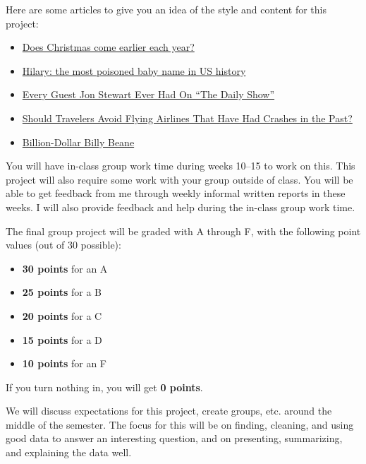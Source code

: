 \documentclass[]{book}
\providecommand{\tightlist}{%
  \setlength{\itemsep}{0pt}\setlength{\parskip}{0pt}}
\begin{document}
Here are some articles to give you an idea of the style and content for
this project:

\begin{itemize}
\tightlist
\item
  \href{http://www.statslife.org.uk/culture/1892-does-christmas-really-come-earlier-every-year}{Does
  Christmas come earlier each year?}
\item
  \href{http://hilaryparker.com/2013/01/30/hilary-the-most-poisoned-baby-name-in-us-history/}{Hilary:
  the most poisoned baby name in US history}
\item
  \href{http://fivethirtyeight.com/datalab/every-guest-jon-stewart-ever-had-on-the-daily-show/}{Every
  Guest Jon Stewart Ever Had On ``The Daily Show''}
\item
  \href{http://fivethirtyeight.com/features/should-travelers-avoid-flying-airlines-that-have-had-crashes-in-the-past/}{Should
  Travelers Avoid Flying Airlines That Have Had Crashes in the Past?}
\item
  \href{http://fivethirtyeight.com/features/billion-dollar-billy-beane/}{Billion-Dollar
  Billy Beane}
\end{itemize}

You will have in-class group work time during weeks 10--15 to work on
this. This project will also require some work with your group outside
of class. You will be able to get feedback from me through weekly
informal written reports in these weeks. I will also provide feedback
and help during the in-class group work time.

The final group project will be graded with A through F, with the
following point values (out of 30 possible):

\begin{itemize}
\tightlist
\item
  \textbf{30 points} for an A
\item
  \textbf{25 points} for a B
\item
  \textbf{20 points} for a C
\item
  \textbf{15 points} for a D
\item
  \textbf{10 points} for an F
\end{itemize}

If you turn nothing in, you will get \textbf{0 points}.

We will discuss expectations for this project, create groups, etc.
around the middle of the semester. The focus for this will be on
finding, cleaning, and using good data to answer an interesting
question, and on presenting, summarizing, and explaining the data well.
\end{document}
